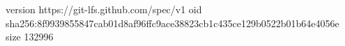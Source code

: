 version https://git-lfs.github.com/spec/v1
oid sha256:8f9939855847cab01d8af96ffc9ace38823cb1c435ce129b0522b01b64e4056e
size 132996
